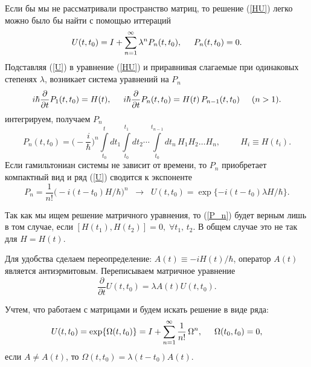 \documentclass[12pt]{article}
\numberwithin{equation}{section}
\begin{document}
Если бы мы не рассматривали пространство матриц, то решение (\ref{HU}) легко можно было бы найти с помощью иттераций
\begin{equation}
\label{U}
U(t,t_0)=I+\sum\limits_{n=1}^\infty\lambda^n P_n(t,t_0), \hspace{0.5cm} P_n(t,t_0)=0.
\end{equation}
Подставляя (\ref{U}) в уравнение (\ref{HU}) и приравнивая слагаемые при одинаковых степенях $\lambda$, возникает система уравнений на $P_n$
\begin{equation}
i\hbar\frac{\partial}{\partial t} P_1(t,t_0)=H(t), \hspace{0.5cm} i\hbar\frac{\partial}{\partial t} P_n(t,t_0)=H(t)\,P_{n-1}(t,t_0) \hspace{0.5cm} (n>1).
\end{equation}
интегрируем, получаем $P_n$
\begin{equation}
\label{P_n}
P_n(t,t_0)=\biggl(-\frac{i}{\hbar}\biggr)^n\int\limits_{t_0}^t dt_1\int\limits_{t_0}^{t_1}dt_2\cdots\int\limits_{t_0}^{t_{n-1}}\!\!dt_n \, H_1 H_2\ldots H_n, \hspace{1cm} H_i\equiv H(t_i). 
\end{equation}
Если гамильтониан системы не зависит от времени, то $P_n$ приобретает компактный вид и ряд (\ref{U}) сводится к экспоненте
\begin{equation}
P_n = \frac{1}{n!}\biggl(-i(t-t_0)H/\hbar\biggr)^n \;\; \to \;\; U(t,t_0)=\exp\{-i(t-t_0)\lambda H/\hbar\}.
\end{equation}

Так как мы ищем решение матричного уравнения, то (\ref{P_n}) будет верным лишь в том случае, если $[H(t_1),H(t_2)]=0, \; \forall t_1,\, t_2$. В общем случае это не так для $H=H(t)$.

Для удобства сделаем переопределение: $A(t)\equiv -iH(t)/\hbar$, оператор $A(t)$ является антиэрмитовым. Переписываем матричное уравнение
\begin{equation}
\frac{\partial}{\partial t} U(t,t_0)=\lambda A(t) U(t,t_0).
\end{equation} 

Учтем, что работаем с матрицами и будем искать решение в виде ряда:
\begin{equation}
U(t,t_0)=\exp\{\Omega(t,t_0)\}=I+\sum\limits_{n=1}^\infty \frac{1}{n!}\,\Omega^n, \hspace{0.5cm} \Omega(t_0,t_0)=0,
\end{equation}
если $A\ne A(t)$, то $\Omega(t,t_0)=\lambda(t-t_0)A(t)$.
\end{document}
